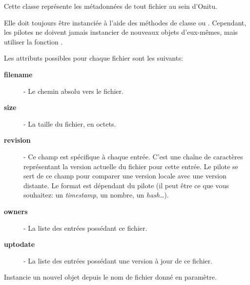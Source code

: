 \documentclass[letterpaper,10pt,english]{sphinxmanual}
\begin{document}
\begin{fulllineitems}
\label{drivers:onitu.api.metadata.Metadata}
Cette classe représente les métadonnées de tout fichier au sein d'Onitu.

Elle doit toujours être instanciée à l'aide des méthodes de classe {\hyperref[drivers:onitu.api.metadata.Metadata.get_by_id]{}} ou {\hyperref[drivers:onitu.api.metadata.Metadata.get_by_filename]{}}. Cependant, les pilotes ne doivent jamais instancier de nouveaux objets {\hyperref[drivers:onitu.api.metadata.Metadata]{}} d'eux-mêmes, mais utiliser la fonction {\hyperref[drivers:onitu.api.Plug.get_metadata]{}}.

Les attributs possibles pour chaque fichier sont les suivants:
\begin{description}
\item[{\textbf{filename}}] \leavevmode-
Le chemin absolu vers le fichier.

\item[{\textbf{size}}] \leavevmode-
La taille du fichier, en octets.

\item[{\textbf{revision}}] \leavevmode-
Ce champ est spécifique à chaque entrée. C'est une chaîne de caractères représentant la version actuelle du fichier pour cette entrée. Le pilote se sert de ce champ pour comparer une version locale avec une version distante. Le format est dépendant du pilote (il peut être ce que vous souhaitez: un \emph{timestamp}, un nombre, un \emph{hash}…).

\item[{\textbf{owners}}] \leavevmode-
La liste des entrées possédant ce fichier.

\item[{\textbf{uptodate}}] \leavevmode-
La liste des entrées possédant une version à jour de ce fichier.

\end{description}

\begin{fulllineitems}
\label{drivers:onitu.api.metadata.Metadata.get_by_filename}
Instancie un nouvel objet {\hyperref[drivers:onitu.api.metadata.Metadata]{}} depuis le nom de fichier donné en paramètre.


\end{fulllineitems}
\end{fulllineitems}
\end{document}
